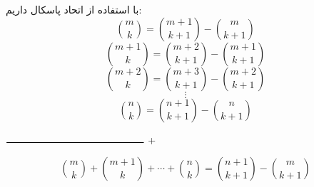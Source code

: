 \p
با استفاده از اتحاد پاسکال داریم:
 \p
$$\binom{m}{k} = \binom{m + 1}{k + 1} - \binom{m}{k + 1}$$
$$\binom{m + 1}{k} = \binom{m + 2}{k + 1} - \binom{m + 1}{k + 1}$$
$$\binom{m + 2}{k} = \binom{m + 3}{k + 1} - \binom{m + 2}{k + 1}$$
$$\vdots$$
$$\binom{n}{k} = \binom{n + 1}{k + 1} - \binom{n}{k + 1}$$
\begin{center}
				$\rule{0.4\textwidth}{0.8pt}$
				\Huge{+}
\end{center}
$$\binom{m}{k} + \binom{m + 1}{k} + \cdots + \binom{n}{k} = \binom{n + 1}{k + 1} - \binom{m}{k + 1}$$